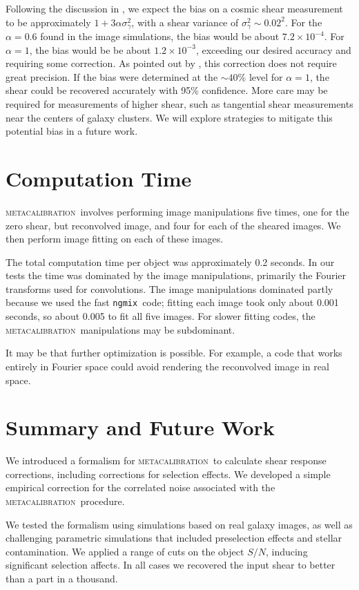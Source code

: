 \documentclass[iop, twocolappendix, appendixfloats, numberedappendix, apj]{emulateapj}
\newcommand{\snr}{$S/N$}
\newcommand{\mcal}{\textsc{metacalibration}}
\newcommand{\ngmix}{\texttt{ngmix}}
\begin{document}
Following the discussion in \cite{bfd2016}, we expect the bias on a cosmic
shear measurement to be approximately $1 + 3\alpha\sigma_\gamma^2$, with a
shear variance of $\sigma_\gamma^2 \sim 0.02^2$.  For the $\alpha=0.6$ found in
the image simulations, the bias would be about $7.2 \times 10^{-4}$. 
For $\alpha=1$, the bias would be be about $1.2 \times 10^{-3}$, exceeding our
desired accuracy and requiring some correction.  As pointed out by
\cite{bfd2016}, this correction does not require great precision.  If the bias
were determined at the $\sim 40$\% level for $\alpha=1$,  the shear could be
recovered accurately with 95\% confidence.  More care may be required for
measurements of higher shear, such as tangential shear measurements near the
centers of galaxy clusters.  We will explore strategies to mitigate this
potential bias in a future work.  

\section{Computation Time}

\mcal\ involves performing image manipulations five times, one for the zero
shear, but reconvolved image, and four for each of the sheared images.
We then perform image fitting on each of these images.

The total computation time per object was approximately 0.2 seconds.  In our
tests the time was dominated by the image manipulations, primarily the Fourier
transforms used for convolutions.  The image manipulations dominated partly
because we used the fast \ngmix\ code; fitting each image took only about 0.001
seconds, so about 0.005 to fit all five images.  For slower fitting codes, the
\mcal\ manipulations may be subdominant.

It may be that further optimization is possible.  For example, a code that
works entirely in Fourier space could avoid rendering the reconvolved image in
real space.

\section{Summary and Future Work} \label{sec:summary}

We introduced a formalism for \mcal\ to calculate shear response corrections,
including corrections for selection effects. We developed a simple empirical
correction for the correlated noise associated with the \mcal\ procedure.

We tested the formalism using simulations based on real galaxy images, as well
as challenging parametric simulations that included preselection effects and
stellar contamination.  We applied a range of cuts on the object \snr, inducing
significant selection affects.  In all cases we recovered the input shear to
better than a part in a thousand.
\end{document}
